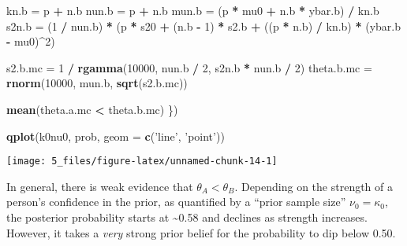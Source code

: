 \documentclass[]{article}
\newenvironment{Shaded}{\begin{snugshade}}{\end{snugshade}}
\newcommand{\DataTypeTok}[1]{\textcolor[rgb]{0.13,0.29,0.53}{#1}}
\newcommand{\DecValTok}[1]{\textcolor[rgb]{0.00,0.00,0.81}{#1}}
\newcommand{\KeywordTok}[1]{\textcolor[rgb]{0.13,0.29,0.53}{\textbf{#1}}}
\newcommand{\NormalTok}[1]{#1}
\newcommand{\OperatorTok}[1]{\textcolor[rgb]{0.81,0.36,0.00}{\textbf{#1}}}
\newcommand{\StringTok}[1]{\textcolor[rgb]{0.31,0.60,0.02}{#1}}
\begin{document}
\begin{Shaded}
\begin{Highlighting}[]
\NormalTok{  kn.b =}\StringTok{ }\NormalTok{p }\OperatorTok{+}\StringTok{ }\NormalTok{n.b}
\NormalTok{  nun.b =}\StringTok{ }\NormalTok{p }\OperatorTok{+}\StringTok{ }\NormalTok{n.b}
\NormalTok{  mun.b =}\StringTok{ }\NormalTok{(p }\OperatorTok{*}\StringTok{ }\NormalTok{mu0 }\OperatorTok{+}\StringTok{ }\NormalTok{n.b }\OperatorTok{*}\StringTok{ }\NormalTok{ybar.b) }\OperatorTok{/}\StringTok{ }\NormalTok{kn.b}
\NormalTok{  s2n.b =}\StringTok{ }\NormalTok{(}\DecValTok{1} \OperatorTok{/}\StringTok{ }\NormalTok{nun.b) }\OperatorTok{*}\StringTok{ }\NormalTok{(p }\OperatorTok{*}\StringTok{ }\NormalTok{s20 }\OperatorTok{+}\StringTok{ }\NormalTok{(n.b }\OperatorTok{-}\StringTok{ }\DecValTok{1}\NormalTok{) }\OperatorTok{*}\StringTok{ }\NormalTok{s2.b }\OperatorTok{+}\StringTok{ }\NormalTok{((p }\OperatorTok{*}\StringTok{ }\NormalTok{n.b) }\OperatorTok{/}\StringTok{ }\NormalTok{kn.b) }\OperatorTok{*}\StringTok{ }\NormalTok{(ybar.b }\OperatorTok{-}\StringTok{ }\NormalTok{mu0)}\OperatorTok{^}\DecValTok{2}\NormalTok{)}
  
\NormalTok{  s2.b.mc =}\StringTok{ }\DecValTok{1} \OperatorTok{/}\StringTok{ }\KeywordTok{rgamma}\NormalTok{(}\DecValTok{10000}\NormalTok{, nun.b }\OperatorTok{/}\StringTok{ }\DecValTok{2}\NormalTok{, s2n.b }\OperatorTok{*}\StringTok{ }\NormalTok{nun.b }\OperatorTok{/}\StringTok{ }\DecValTok{2}\NormalTok{)}
\NormalTok{  theta.b.mc =}\StringTok{ }\KeywordTok{rnorm}\NormalTok{(}\DecValTok{10000}\NormalTok{, mun.b, }\KeywordTok{sqrt}\NormalTok{(s2.b.mc))}
  
  \KeywordTok{mean}\NormalTok{(theta.a.mc }\OperatorTok{<}\StringTok{ }\NormalTok{theta.b.mc)}
\NormalTok{\})}

\KeywordTok{qplot}\NormalTok{(k0nu0, prob, }\DataTypeTok{geom =} \KeywordTok{c}\NormalTok{(}\StringTok{'line'}\NormalTok{, }\StringTok{'point'}\NormalTok{))}
\end{Highlighting}
\end{Shaded}

\begin{center}\texttt{[image: 5\_files/figure-latex/unnamed-chunk-14-1]} \end{center}

In general, there is weak evidence that \(\theta_A < \theta_B\).
Depending on the strength of a person's confidence in the prior, as
quantified by a ``prior sample size'' \(\nu_0 = \kappa_0\), the
posterior probability starts at \textasciitilde{}0.58 and declines as
strength increases. However, it takes a \emph{very} strong prior belief
for the probability to dip below 0.50.
\end{document}
